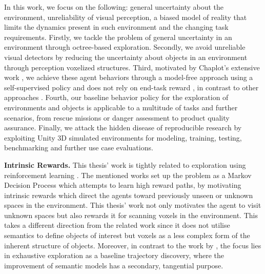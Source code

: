 In this work, we focus on the following: general uncertainty about the environment, unreliability of visual perception, a biased model of reality that limits the dynamics present in such environment and the changing task requirements. Firstly, we tackle the problem of general uncertainty in an environment through octree-based exploration. Secondly, we avoid unreliable visual detectors by reducing the uncertainty about objects in an environment through perception voxelized structures. Third, motivated by Chaplot's extensive work \cite{chaplot2017arnold, chaplot2018gated, chaplot2020learning, chaplot2020neural, chaplot2020semantic}, we achieve these agent behaviors through a model-free approach using a self-supervised policy and does not rely on end-task reward \cite{schulman2017proximal, sung2018exploring}, in contrast to other approaches \cite{chaplot2018active, jayaraman2018learning, yang2019embodied}. Fourth, our baseline behavior policy for the exploration of environments and objects is applicable to a multitude of tasks and further scenarios, from rescue missions or danger assessment to product quality assurance. Finally, we attack the hidden disease of reproducible research by exploiting Unity 3D simulated environments for modeling, training, testing, benchmarking and further use case evaluations.




\textbf{Intrinsic Rewards.} %
This thesis' work is tightly related to exploration using reinforcement learning \cite{auer2002using, jaksch2010near, schmidhuber1991possibility, sutton2018reinforcement}. 
The mentioned works set up the problem as a Markov Decision Process which attempts to learn high reward paths, by motivating intrinsic rewards which direct the agents toward previously unseen \cite{eysenbach2018diversity} or unknown spaces \cite{pathak2017curiosity} in the environment. 
%
This thesis' work not only motivates the agent to visit unknown spaces but also rewards it for scanning voxels in the environment. This takes a different direction from the related work since it does not utilise semantics to define objects of interest but voxels as a less complex form of the inherent structure of objects. Moreover, in contrast to the work by \cite{chaplot2020semantic}, the focus lies in exhaustive exploration as a baseline trajectory discovery, where the improvement of semantic models has a secondary, tangential purpose. 

